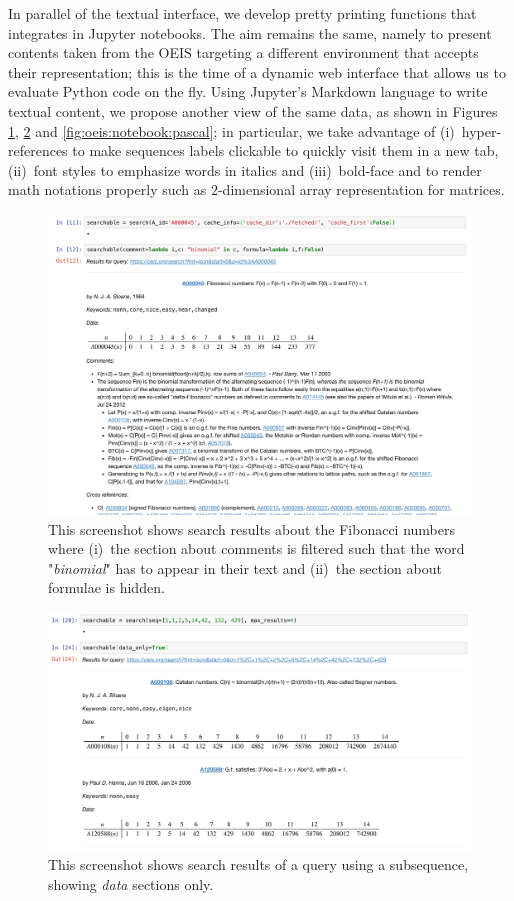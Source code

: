 In parallel of the textual interface, we develop pretty printing functions that
integrates in Jupyter notebooks. The aim remains the same, namely to present
contents taken from the OEIS targeting a different environment that accepts
their representation; this is the time of a dynamic web interface that allows
us to evaluate Python code on the fly. Using Jupyter's Markdown language to
write textual content, we propose another view of the same data, as shown in
Figures \ref{fig:oeis:notebook:fibonacci}, \ref{fig:oeis:notebook:catalan} and
\ref{fig:oeis:notebook:pascal}; in particular, we take advantage of
(i)~hyper-references to make sequences labels clickable to quickly visit them
in a new tab, (ii)~font styles to emphasize words in italics and
(iii)~bold-face and to render math notations properly such as $2$-dimensional
array representation for matrices.
\vfill

\begin{figure}
\includegraphics{OEIS/notebook-fibonacci}
\caption{This screenshot shows search results about the Fibonacci numbers where
(i)~the section about comments is filtered such that the word "\emph{binomial}"
has to appear in their text and (ii)~the section about formulae is hidden.}
\label{fig:oeis:notebook:fibonacci}
\end{figure}

\begin{figure}
\includegraphics{OEIS/notebook-catalan}
\caption{This screenshot shows search results of a query using a subsequence,
showing \emph{data} sections only.}
\label{fig:oeis:notebook:catalan}
\end{figure}


